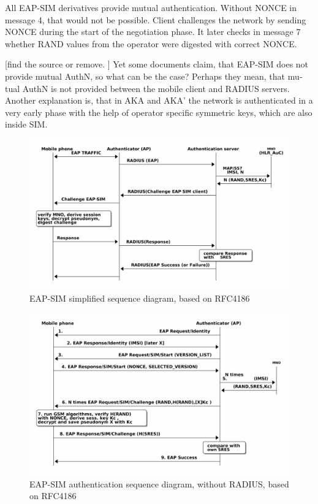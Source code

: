 \documentclass[12pt,a4paper,english]{tutthesis}
\begin{document}
\begin{otherlanguage}{english}
All EAP-SIM derivatives provide mutual authentication. Without NONCE
in message 4, that would not be possible. 
 Client challenges the network by
sending NONCE during the start of the negotiation phase. It later checks in
message 7 whether RAND values from the operator were digested with correct NONCE.

[find the source or remove. ] 
Yet some documents claim, that EAP-SIM does not provide mutual AuthN, so what
can be the case? Perhaps they mean, that mutual AuthN is not provided between
the mobile client  and RADIUS servers. Another explanation is, that in AKA
and AKA' the network is authenticated in a very early phase with the
help of operator specific symmetric keys, which are also inside SIM.





\begin{figure}[htb]
\centering
\includegraphics[width=.9\linewidth]{eap-sim-simple.png}
\caption{\label{fig:eap-sim-simple}EAP-SIM simplified sequence diagram, based on RFC4186}
\end{figure}




\begin{figure}[htb]
\centering
\includegraphics[width=.9\linewidth]{eap-sim-full.png}
\caption{\label{fig:eap-sim-full}EAP-SIM authentication sequence diagram, without RADIUS, based on RFC4186}
\end{figure}



\end{otherlanguage}
\end{document}
